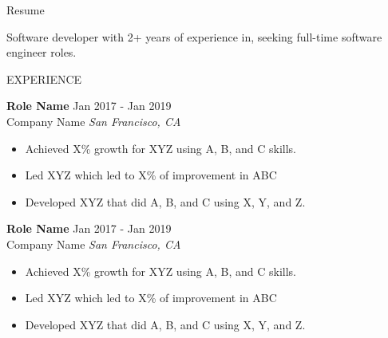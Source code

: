 \documentclass{resume} %
\begin{document}

\begin{rSection}{Resume}

    {Software developer with 2+ years of experience in, seeking full-time software engineer roles.}


\end{rSection}



\begin{rSection}{EXPERIENCE}

    \textbf{Role Name} \hfill Jan 2017 - Jan 2019\\
    Company Name \hfill \textit{San Francisco, CA}
     \begin{itemize}
        \itemsep -3pt {}
         \item Achieved X\% growth for XYZ using A, B, and C skills.
         \item Led XYZ which led to X\% of improvement in ABC
        \item Developed XYZ that did A, B, and C using X, Y, and Z.
     \end{itemize}

    \textbf{Role Name} \hfill Jan 2017 - Jan 2019\\
    Company Name \hfill \textit{San Francisco, CA}
     \begin{itemize}
        \itemsep -3pt {}
         \item Achieved X\% growth for XYZ using A, B, and C skills.
         \item Led XYZ which led to X\% of improvement in ABC
        \item Developed XYZ that did A, B, and C using X, Y, and Z.
     \end{itemize}

\end{rSection}

\end{document}
